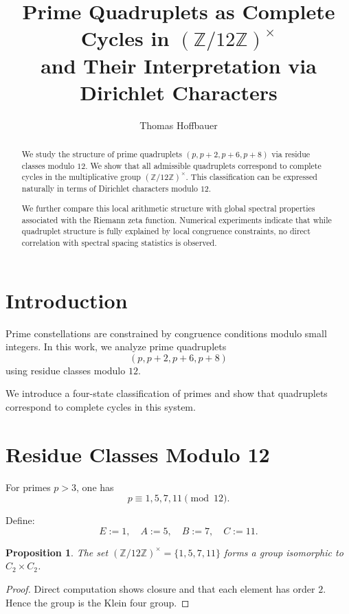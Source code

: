 \documentclass[11pt]{article}
\title{Prime Quadruplets as Complete Cycles in $(\mathbb{Z}/12\mathbb{Z})^\times$ \\
and Their Interpretation via Dirichlet Characters}
\author{Thomas Hoffbauer}
\date{}
\newtheorem{proposition}{Proposition}
\begin{document}
\maketitle

\begin{abstract}
We study the structure of prime quadruplets $(p,p+2,p+6,p+8)$ via residue classes modulo $12$. 
We show that all admissible quadruplets correspond to complete cycles in the multiplicative group 
$(\mathbb{Z}/12\mathbb{Z})^\times$. This classification can be expressed naturally in terms of 
Dirichlet characters modulo $12$. 

We further compare this local arithmetic structure with global spectral properties associated 
with the Riemann zeta function. Numerical experiments indicate that while quadruplet structure 
is fully explained by local congruence constraints, no direct correlation with spectral spacing 
statistics is observed.
\end{abstract}

\section{Introduction}

Prime constellations are constrained by congruence conditions modulo small integers. 
In this work, we analyze prime quadruplets
\[
(p, p+2, p+6, p+8)
\]
using residue classes modulo $12$.

We introduce a four-state classification of primes and show that quadruplets correspond 
to complete cycles in this system.

\section{Residue Classes Modulo 12}

For primes $p > 3$, one has
\[
p \equiv 1,5,7,11 \pmod{12}.
\]

Define:
\[
E := 1,\quad A := 5,\quad B := 7,\quad C := 11.
\]

\begin{proposition}
The set $(\mathbb{Z}/12\mathbb{Z})^\times = \{1,5,7,11\}$ forms a group 
isomorphic to $C_2 \times C_2$.
\end{proposition}

\begin{proof}
Direct computation shows closure and that each element has order $2$. 
Hence the group is the Klein four group.
\end{proof}
\end{document}
